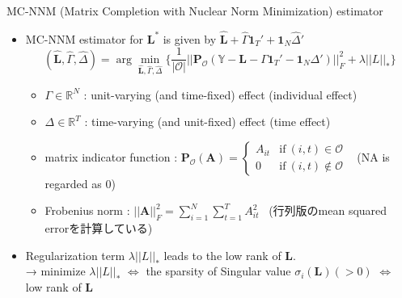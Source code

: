 \documentclass[xcolor=svgnames,aspectratio=169]{beamer}
\newcommand{\R}{\mathbb{R}}
\begin{document}
\begin{frame}{MC-NNM (Matrix Completion with Nuclear Norm Minimization) estimator}
    \begin{itemize}
        \item MC-NNM estimator for $\mathbf{L^*}$ is given by $\mathbf{\hat{L}}+\hat{\Gamma}\mathbf{1}_T' + \mathbf{1}_N\hat{\Delta}'$
        \[
        (\mathbf{\hat{L}}, \hat{\Gamma}, \hat{\Delta})=\arg \min_{\mathbf{\hat{L}}, \hat{\Gamma}, \hat{\Delta}} 
        \{
            \frac{1}{|\mathcal{O} |}  ||\mathbf{P_{\mathcal{O} }}({\mathbb{Y}-\mathbf{L}-\Gamma}\mathbf{1}_T'-\mathbf{1}_N\Delta')||_F^2+\lambda||L||_*
        \}
        \]
        \begin{itemize}
            \item $\Gamma\in\R^N$ : unit-varying (and time-fixed) effect (individual effect)
            \item $\Delta\in\R^T$ : time-varying (and unit-fixed) effect (time effect) 
            \item matrix indicator function : $\mathbf{P_{\mathcal{O} }}(\mathbf{A})=
            \begin{cases}
                A_{it} & \text{if} \ (i,t)\in\mathcal{O} \\ 0 & \text{if} \ (i,t) \notin \mathcal{O}  
            \end{cases}$ \ (NA is regarded as $0$)
            \item Frobenius norm : $||\mathbf{A}||_F^2=\sum_{i=1}^N\sum_{t=1}^T A_{it}^2$ \ (行列版のmean squared errorを計算している)
        \end{itemize}
        \item Regularization term $\lambda||L||_*$ leads to \alert{the low rank of $\mathbf{L}$}. \\
        → minimize $\lambda||L||_*$ $\Leftrightarrow $ the sparsity of Singular value $\sigma_i(\mathbf{L})(>0)$ $\Leftrightarrow $ low rank of $\mathbf{L}$
    \end{itemize}
\end{frame}
\end{document}
